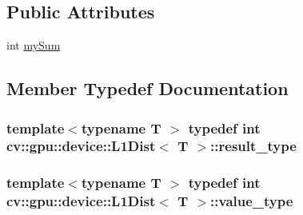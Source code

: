 \subsection*{Public Attributes}
\begin{DoxyCompactItemize}
\item 
int \hyperlink{structcv_1_1gpu_1_1device_1_1L1Dist_ade0889c2e3c2dad376b197426d15f011}{my\-Sum}
\end{DoxyCompactItemize}


\subsection{Member Typedef Documentation}
\hypertarget{structcv_1_1gpu_1_1device_1_1L1Dist_a7e30b00eb05c3d17cad6f588e55917fa}{
\subsubsection[{result\-\_\-type}]{\setlength{\rightskip}{0pt plus 5cm}template$<$typename T $>$ typedef int {\bf cv\-::gpu\-::device\-::\-L1\-Dist}$<$ {\bf T} $>$\-::{\bf result\-\_\-type}}}\label{structcv_1_1gpu_1_1device_1_1L1Dist_a7e30b00eb05c3d17cad6f588e55917fa}
\hypertarget{structcv_1_1gpu_1_1device_1_1L1Dist_a73da9e9f3e581fa8c905f126cbad58bd}{
\subsubsection[{value\-\_\-type}]{\setlength{\rightskip}{0pt plus 5cm}template$<$typename T $>$ typedef int {\bf cv\-::gpu\-::device\-::\-L1\-Dist}$<$ {\bf T} $>$\-::{\bf value\-\_\-type}}}\label{structcv_1_1gpu_1_1device_1_1L1Dist_a73da9e9f3e581fa8c905f126cbad58bd}


